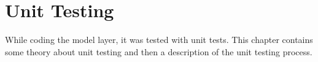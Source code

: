 \chapter{Unit Testing}
While coding the model layer, it was tested with unit tests. This chapter contains some theory about unit testing and then a description of the unit testing process.